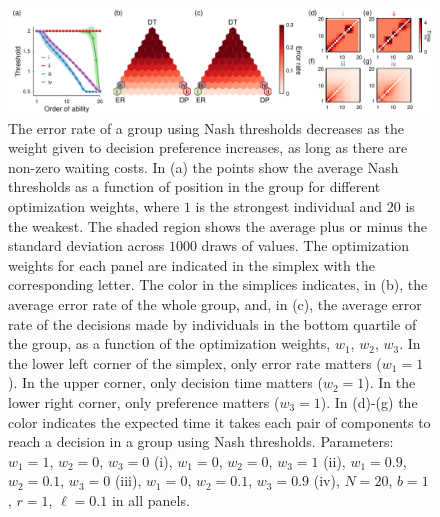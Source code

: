 \documentclass{pnastwo}
\begin{document}
\begin{figure}[htp]
\includegraphics[width=6.83in]{Figure2.pdf}
\caption{\label{groupeq}  The error rate of a group using Nash thresholds decreases as the weight given to decision preference increases, as long as there are non-zero waiting costs. In (a) the points show the average Nash thresholds as a function of position in the group for different optimization weights, where $1$ is the strongest individual and $20$ is the weakest. The shaded region shows the average plus or minus the standard deviation across $1000$ draws of values.  The optimization weights for each panel are indicated in the simplex with the corresponding letter. The color in the simplices indicates, in (b), the average error rate of the whole group, and, in (c), the average error rate of the decisions made by individuals in the bottom quartile of the group, as a function of the optimization weights, $w_1$, $w_2$, $w_3$.  In the lower left corner of the simplex, only error rate matters ($w_1=1$).  In the upper corner, only decision time matters ($w_2=1$).  In the lower right corner, only preference matters ($w_3=1$).   In (d)-(g) the color indicates the expected time it takes each pair of components to reach a decision in a group using Nash thresholds. Parameters: $w_1=1$, $w_2=0$, $w_3=0$ (i), $w_1=0$, $w_2=0$, $w_3=1$ (ii), $w_1=0.9$, $w_2=0.1$, $w_3=0$ (iii), $w_1=0$, $w_2=0.1$, $w_3=0.9$ (iv), $N=20$, $b=1$, $r=1$, $\ell=0.1$ in all panels.  }

\end{figure}
\end{document}
